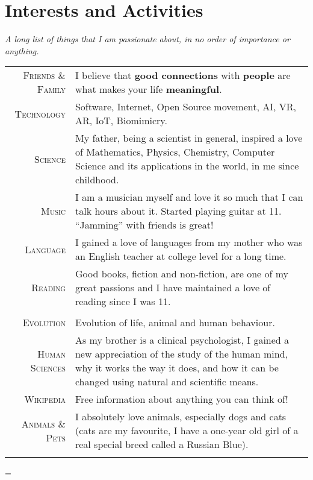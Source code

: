 \documentclass[a4paper,10pt,notitlepage]{article}
\newenvironment{absolutelynopagebreak}
  {\par\nobreak\vfil\penalty0\vfilneg
   \vtop\bgroup}
  {\par\xdef\tpd{\the\prevdepth}\egroup
   \prevdepth=\tpd}
\begin{document}
\begin{absolutelynopagebreak}
\section{Interests and Activities}

\textit{A long list of things that I am passionate about, in no order of importance or anything.} \\

\begin{tabular}{r|p{11cm}}

 \textsc{Friends \& Family} & I believe that \textbf{good connections} with \textbf{people} are what makes your life \textbf{meaningful}. \\
 \textsc{Technology} & Software, Internet, Open Source movement, AI, VR, AR, IoT, Biomimicry. \\
 \textsc{Science} & My father, being a scientist in general, inspired a love of Mathematics, Physics, Chemistry, Computer Science and its applications in the world, in me since childhood. \\
 \textsc{Music} & I am a musician myself and love it so much that I can talk hours about it. Started playing guitar at 11. ``Jamming'' with friends is great! \\
 \textsc{Language} & I gained a love of languages from my mother who was an English teacher at college level for a long time. \\
 \textsc{Reading} & Good books, fiction and non-fiction, are one of my great passions and I have maintained a love of reading since I was 11. \\
 
 \multicolumn{2}{c}{}\\
  
 \textsc{Evolution} & Evolution of life, animal and human behaviour. \\
 \textsc{Human Sciences} & As my brother is a clinical psychologist, I gained a new appreciation of the study of the human mind, why it works the way it does, and how it can be changed using natural and scientific means. \\
 \textsc{Wikipedia} & Free information about anything you can think of! \\
 \textsc{Animals \& Pets} & I absolutely love animals, especially dogs and cats (cats are my favourite, I have a one-year old girl of a real special breed called a Russian Blue). \\
 
  \multicolumn{2}{c}{}\\
  

\end{tabular}
\end{absolutelynopagebreak}
\end{document}
